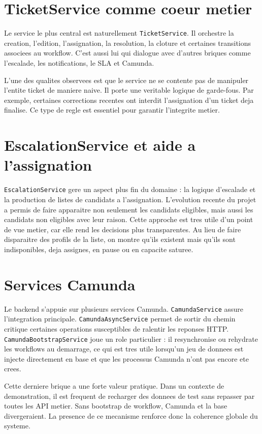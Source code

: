 \section{TicketService comme coeur metier}

Le service le plus central est naturellement \texttt{TicketService}. Il orchestre la creation, l'edition, l'assignation, la resolution, la cloture et certaines transitions associees au workflow. C'est aussi lui qui dialogue avec d'autres briques comme l'escalade, les notifications, le SLA et Camunda.

L'une des qualites observees est que le service ne se contente pas de manipuler l'entite ticket de maniere naive. Il porte une veritable logique de garde-fous. Par exemple, certaines corrections recentes ont interdit l'assignation d'un ticket deja finalise. Ce type de regle est essentiel pour garantir l'integrite metier.

\section{EscalationService et aide a l'assignation}

\texttt{EscalationService} gere un aspect plus fin du domaine : la logique d'escalade et la production de listes de candidats a l'assignation. L'evolution recente du projet a permis de faire apparaitre non seulement les candidats eligibles, mais aussi les candidats non eligibles avec leur raison. Cette approche est tres utile d'un point de vue metier, car elle rend les decisions plus transparentes. Au lieu de faire disparaitre des profils de la liste, on montre qu'ils existent mais qu'ils sont indisponibles, deja assignes, en pause ou en capacite saturee.

\section{Services Camunda}

Le backend s'appuie sur plusieurs services Camunda. \texttt{CamundaService} assure l'integration principale. \texttt{CamundaAsyncService} permet de sortir du chemin critique certaines operations susceptibles de ralentir les reponses HTTP. \texttt{CamundaBootstrapService} joue un role particulier : il resynchronise ou rehydrate les workflows au demarrage, ce qui est tres utile lorsqu'un jeu de donnees est injecte directement en base et que les processus Camunda n'ont pas encore ete crees.

Cette derniere brique a une forte valeur pratique. Dans un contexte de demonstration, il est frequent de recharger des donnees de test sans repasser par toutes les API metier. Sans bootstrap de workflow, Camunda et la base divergeraient. La presence de ce mecanisme renforce donc la coherence globale du systeme.

